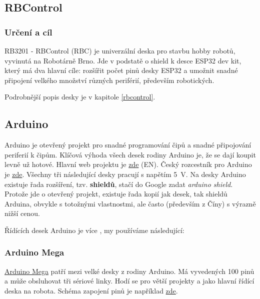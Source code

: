 \subsection{RBControl} 

\subsubsection*{Určení a cíl}

RB3201 - RBControl (RBC) je univerzální deska pro stavbu hobby robotů, vyvinutá na Robotárně Brno. 
Jde v podstatě o shield k desce ESP32 dev kit, který má dva hlavní cíle: 
rozšířit počet pinů desky ESP32 a umožnit snadné připojení velkého množství různých periférií, především robotických. 

Podrobnější popis desky je v kapitole \ref{rbcontrol}.

\subsection{Arduino} 

Arduino je otevřený projekt pro snadné programování čipů a snadné připojování periferií k čipům.
Klíčová výhoda všech desek rodiny Arduino je, že se dají koupit levně už hotové. 
Hlavní web projektu je \href{https://www.arduino.cc/}{zde} (EN). 
Český rozcestník pro Arduino je \href{https://robotikabrno.cz/robotika-brno/navody/arduino}{zde}.
Všechny tři následující desky pracují s napětím 5~V. Na desky Arduino existuje řada rozšíření, 
tzv. \textbf{shieldů},  stačí do Google zadat \textit{arduino shield}.
Protože jde o otevřený projekt, existuje řada kopií jak desek, tak shieldů Arduina, obvykle s totožnými 
vlastnostmi, ale často (především z Číny) s výrazně nižší cenou. 

Řídících desek Arduino je více \cite[strana 3--10]{ard}, my používáme následující: 

\subsubsection*{Arduino Mega} \label{mega} 

\href{https://store.arduino.cc/arduino-mega-2560-rev3}{Arduino Mega} patří mezi velké desky z rodiny Arduino. 
Má vyvedených 100 pinů a může obsluhovat tři sériové linky. 
Hodí se pro větší projekty a jako hlavní řídící deska na robota. 
Schéma zapojení pinů je například \href{https://arduino-info.wikispaces.com/MegaQuickRef}{zde}.

